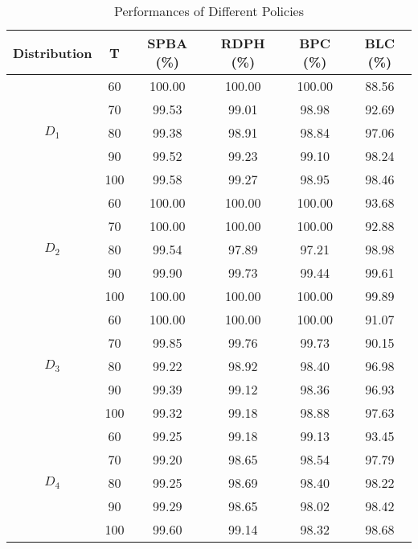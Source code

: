 \begin{table}[h]
    \centering
    \caption{Performances of Different Policies}\label{tab_perf}
    \begin{tabular}{cccccc}
    \hline
    Distribution & T & SPBA (\%) & RDPH (\%) & BPC (\%) & BLC (\%) \\
    \hline
    \multirow{5}{*}{$D_1$} & 60 & 100.00 & 100.00 & 100.00 & 88.56 \\
    & 70    & 99.53 & 99.01 & 98.98 & 92.69  \\
    & 80    & 99.38 & 98.91 & 98.84 & 97.06  \\
    & 90    & 99.52 & 99.23 & 99.10 & 98.24  \\
    & 100   & 99.58 & 99.27 & 98.95 & 98.46 \\
    \hline
    \multirow{5}{*}{$D_2$} & 60  & 100.00 & 100.00 & 100.00 & 93.68  \\
       & 70  & 100.00 & 100.00 & 100.00 & 92.88  \\
       & 80  & 99.54 & 97.89 & 97.21 & 98.98  \\
       & 90  & 99.90 & 99.73 & 99.44 & 99.61  \\
       & 100 & 100.00 & 100.00 & 100.00 & 99.89  \\
    \hline
    \multirow{5}{*}{$D_3$} & 60  & 100.00 & 100.00 & 100.00 & 91.07  \\
    & 70  & 99.85 & 99.76 & 99.73 & 90.15 \\
    & 80  & 99.22 & 98.92 & 98.40 & 96.98  \\
    & 90  & 99.39 & 99.12 & 98.36 & 96.93  \\
    & 100  & 99.32 & 99.18 & 98.88 & 97.63  \\
      \hline
      \multirow{5}{*}{$D_4$} & 60  & 99.25 & 99.18 & 99.13 & 93.45  \\
       & 70  & 99.20 & 98.65 & 98.54 & 97.79  \\
       & 80  & 99.25 & 98.69 & 98.40 & 98.22 \\
       & 90  & 99.29 & 98.65 & 98.02 & 98.42  \\
       & 100 & 99.60 & 99.14 & 98.32 & 98.68 \\
    \hline
    \end{tabular}
  \end{table}


